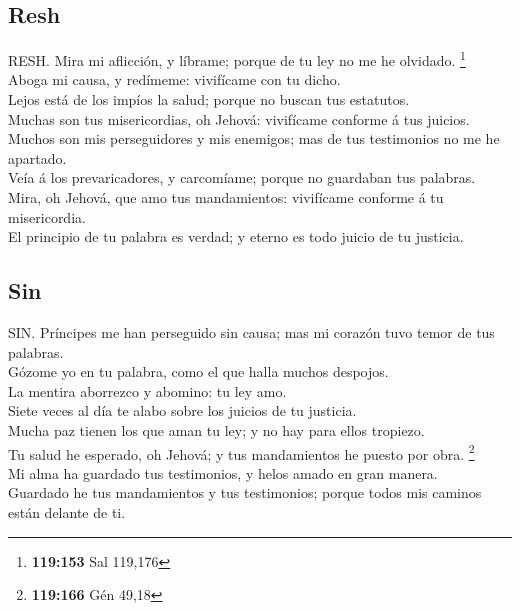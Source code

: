 \hypertarget{resh}{%
\subsection{Resh}\label{resh}}

 RESH. Mira mi aflicción, y líbrame; porque de tu ley no
me he olvidado. \footnote{\textbf{119:153} Sal 119,176}\\
 Aboga mi causa, y redímeme: vivifícame con tu dicho.\\
 Lejos está de los impíos la salud; porque no buscan tus
estatutos.\\
 Muchas son tus misericordias, oh Jehová: vivifícame
conforme á tus juicios.\\
 Muchos son mis perseguidores y mis enemigos; mas de tus
testimonios no me he apartado.\\
 Veía á los prevaricadores, y carcomíame; porque no
guardaban tus palabras.\\
 Mira, oh Jehová, que amo tus mandamientos: vivifícame
conforme á tu misericordia.\\
 El principio de tu palabra es verdad; y eterno es todo
juicio de tu justicia.

\hypertarget{sin}{%
\subsection{Sin}\label{sin}}

 SIN. Príncipes me han perseguido sin causa; mas mi
corazón tuvo temor de tus palabras.\\
 Gózome yo en tu palabra, como el que halla muchos
despojos.\\
 La mentira aborrezco y abomino: tu ley amo.\\
 Siete veces al día te alabo sobre los juicios de tu
justicia.\\
 Mucha paz tienen los que aman tu ley; y no hay para
ellos tropiezo.\\
 Tu salud he esperado, oh Jehová; y tus mandamientos he
puesto por obra. \footnote{\textbf{119:166} Gén 49,18}\\
 Mi alma ha guardado tus testimonios, y helos amado en
gran manera.\\
 Guardado he tus mandamientos y tus testimonios; porque
todos mis caminos están delante de ti.

